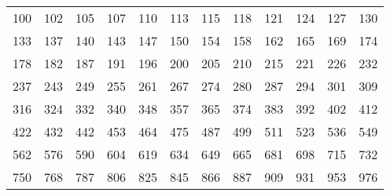 \vspace{3mm}
\begin{center}
   \begin{tabular}{cccccccccccc}
   \toprule[1pt]
   100 & 102 & 105 & 107 & 110 & 113 & 115 & 118 & 121 & 124 & 127 & 130 \\
   133 & 137 & 140 & 143 & 147 & 150 & 154 & 158 & 162 & 165 & 169 & 174 \\
   178 & 182 & 187 & 191 & 196 & 200 & 205 & 210 & 215 & 221 & 226 & 232 \\
   237 & 243 & 249 & 255 & 261 & 267 & 274 & 280 & 287 & 294 & 301 & 309 \\
   316 & 324 & 332 & 340 & 348 & 357 & 365 & 374 & 383 & 392 & 402 & 412 \\
   422 & 432 & 442 & 453 & 464 & 475 & 487 & 499 & 511 & 523 & 536 & 549 \\
   562 & 576 & 590 & 604 & 619 & 634 & 649 & 665 & 681 & 698 & 715 & 732 \\
   750 & 768 & 787 & 806 & 825 & 845 & 866 & 887 & 909 & 931 & 953 & 976 \\
   \bottomrule[1pt]
   \end{tabular}
\end{center}

